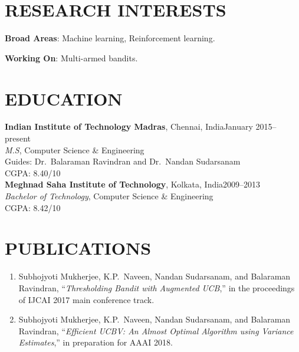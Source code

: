 \documentclass[margin,11pt]{res}
\begin{document}
\begin{resume}

\section{RESEARCH INTERESTS}
\textbf{Broad Areas}: Machine learning, Reinforcement learning.

\par
\textbf{Working On}: Multi-armed bandits.


\section{EDUCATION}
\textbf{Indian Institute of Technology Madras}, Chennai, India\hfill January 2015--present\\
{\sl M.S}, Computer Science \& Engineering
\\Guides: Dr.~Balaraman Ravindran and Dr.~Nandan Sudarsanam\\CGPA: 8.40/10
\\[0.25cm]
\textbf{Meghnad Saha Institute of Technology}, Kolkata, India\hfill 2009--2013\\
{\sl Bachelor of Technology}, Computer Science \& Engineering\\ CGPA: 8.42/10
\section{PUBLICATIONS}
\begin{enumerate}[leftmargin=*]
\item Subhojyoti Mukherjee, K.P.~Naveen, Nandan Sudarsanam, and Balaraman Ravindran, ``\textit{Thresholding Bandit with Augmented UCB},'' in the proceedings of IJCAI 2017 main conference track.
\item Subhojyoti Mukherjee, K.P.~Naveen, Nandan Sudarsanam, and Balaraman Ravindran, ``\textit{Efficient UCBV: An Almost Optimal Algorithm using Variance Estimates},'' in preparation for AAAI 2018.
\end{enumerate}


\end{resume}
\end{document}
